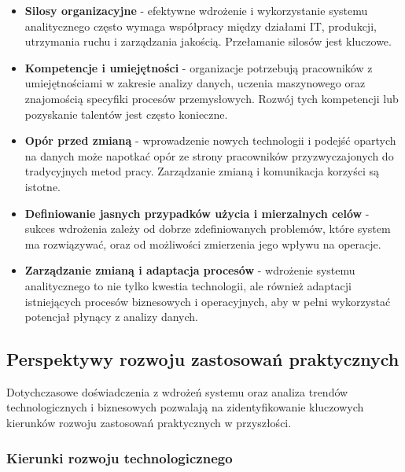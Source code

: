 \begin{itemize}
    \item \textbf{Silosy organizacyjne} - efektywne wdrożenie i wykorzystanie systemu analitycznego często wymaga współpracy między działami IT, produkcji, utrzymania ruchu i zarządzania jakością. Przełamanie silosów jest kluczowe.
    \item \textbf{Kompetencje i umiejętności} - organizacje potrzebują pracowników z umiejętnościami w zakresie analizy danych, uczenia maszynowego oraz znajomością specyfiki procesów przemysłowych. Rozwój tych kompetencji lub pozyskanie talentów jest często konieczne.
    \item \textbf{Opór przed zmianą} - wprowadzenie nowych technologii i podejść opartych na danych może napotkać opór ze strony pracowników przyzwyczajonych do tradycyjnych metod pracy. Zarządzanie zmianą i komunikacja korzyści są istotne.
    \item \textbf{Definiowanie jasnych przypadków użycia i mierzalnych celów} - sukces wdrożenia zależy od dobrze zdefiniowanych problemów, które system ma rozwiązywać, oraz od możliwości zmierzenia jego wpływu na operacje.
    \item \textbf{Zarządzanie zmianą i adaptacja procesów} - wdrożenie systemu analitycznego to nie tylko kwestia technologii, ale również adaptacji istniejących procesów biznesowych i operacyjnych, aby w pełni wykorzystać potencjał płynący z analizy danych.
\end{itemize}

\subsection{Perspektywy rozwoju zastosowań praktycznych}
\label{subsec:perspektywy_rozwoju}

Dotychczasowe doświadczenia z wdrożeń systemu oraz analiza trendów technologicznych i biznesowych pozwalają na zidentyfikowanie kluczowych kierunków rozwoju zastosowań praktycznych w przyszłości.

\subsubsection{Kierunki rozwoju technologicznego}
\label{subsubsec:kierunki_rozwoju_tech}

